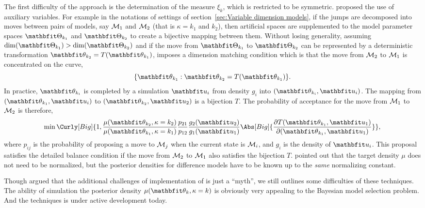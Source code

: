\documentclass[11pt, hyper, bib, fontset=Minion]{marticle}
\begin{document}
The first difficulty of the \rjmcmc approach is the determination of the
measure $\xi_k$, which is restricted to be symmetric. \textcite{Green:1995dg}
proposed the use of auxiliary variables. For example in the notations of
settings of section~\ref{sec:Variable dimension models}, if the jumps are
decomposed into moves between pairs of models, say $\mathcal{M}_1$ and $\mathcal{M}_2$
(that is $\kappa = k_1$ and $k_2$), then artificial spaces are supplemented to
the model parameter spaces $\bTh_{k_1}$ and $\bTh_{k_2}$ to create a bijective
mapping between them. Without losing generality, assuming $\dim(\bTh_{k_1}) >
\dim(\bTh_{k_2})$ and if the move from $\bTh_{k_1}$ to $\bTh_{k_2}$ can be
represented by a deterministic transformation $\bth_{k_2}= T(\bth_{k_1})$,
\textcite{Green:1995dg} imposes a dimension matching condition which is that
the move from $\mathcal{M}_2$ to $\mathcal{M}_1$ is concentrated on the curve,
\begin{equation}
  \{\bth_{k_1}:\bth_{k_2}= T(\bth_{k_1})\}.
\end{equation}
In practice, $\bth_{k_i}$ is completed by a simulation $\bfu_i$ from density
$g_i$ into $(\bth_{k_i},\bfu_i)$. The mapping from $(\bth_{k_1},\bfu_i)$ to
$(\bth_{k_2},\bfu_2)$ is a bijection $T$. The probability of acceptance for
the move from $\mathcal{M}_1$ to $\mathcal{M}_2$ is therefore,
\begin{equation}
  \min\Curly[Big]{1,
    \frac{\mu(\bth_{k_2},\kappa = k_2)}{\mu(\bth_{k_1},\kappa = k_1)}
    \frac{p_{21}}{p_{12}} \frac{g_2(\bfu_2)}{g_1(\bfu_1)}
    \Abs[Big]{
      \frac{\partial T(\bth_{k_1},\bfu_1)}{\partial (\bth_{k_1},\bfu_1)}}},
\end{equation}
where $p_{ij}$ is the probability of proposing a move to $\mathcal{M}_j$ when the
current state is $\mathcal{M}_i$, and $g_i$ is the density of $\bfu_i$. This
proposal satisfies the detailed balance condition if the move from $\mathcal{M}_2$
to $\mathcal{M}_1$ also satisfies the bijection $T$. \textcite{Green:1995dg} pointed
out that the target density $\mu$ does not need to be normalized, but the
posterior densities for difference models have to be known up to the
\emph{same} normalizing constant.

Though \textcite{Green:2009tr} argued that the additional challenges of
implementation of \rjmcmc is just a ``myth'', we still outlines some
difficulties of these techniques. The ability of simulation the posterior
density $\mu(\bth_k,\kappa = k)$ is obviously very appealing to the Bayesian
model selection problem. And the \rjmcmc techniques is under active
development today.
\end{document}
